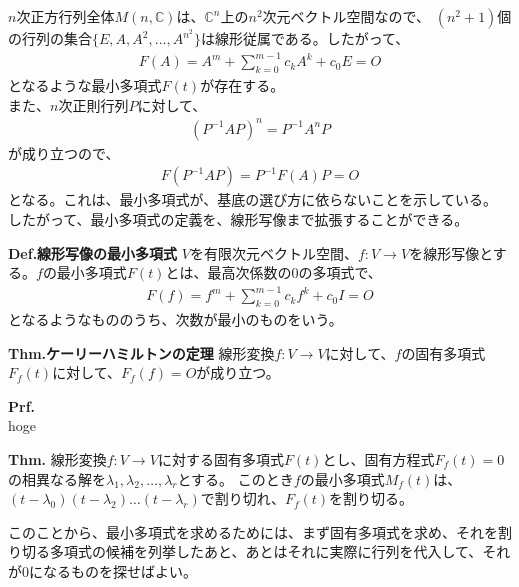 \documentclass[a4paper,11pt]{jsarticle}
\numberwithin{equation}{section}
\begin{document}
$n$次正方行列全体$M(n, \mathbb{C})$は、$\mathbb{C}^n$上の$n^2$次元ベクトル空間なので、
 $(n^2+1)$個の行列の集合$\{E, A, A^2, \dots, A^{n^2}\}$は線形従属である。したがって、
  \begin{align}
      F(A) = A^{m} + \sum_{k=0}^{m-1} c_kA^k + c_0E = O
  \end{align}
  となるような最小多項式$F(t)$が存在する。\\
  また、$n$次正則行列$P$に対して、
  \begin{align}
      (P^{-1}AP)^{n} = P^{-1}A^{n}P
  \end{align}
  が成り立つので、
  \begin{align}
      F(P^{-1}AP) = P^{-1}F(A)P = O
  \end{align}
  となる。これは、最小多項式が、基底の選び方に依らないことを示している。\\
  したがって、最小多項式の定義を、線形写像まで拡張することができる。

  \begin{itembox}[l]{\textbf{Def.線形写像の最小多項式}}
    $V$を有限次元ベクトル空間、$f: V \to V$を線形写像とする。$f$の最小多項式$F(t)$とは、最高次係数の0の多項式で、
    \begin{align}
        F(f) = f^{m} + \sum_{k=0}^{m-1} c_kf^{k} + c_0I = O
    \end{align}
    となるようなもののうち、次数が最小のものをいう。
\end{itembox}

\begin{itembox}[l]{\textbf{Thm.ケーリーハミルトンの定理}}
    線形変換$f: V \to V$に対して、$f$の固有多項式$F_f(t)$に対して、$F_f(f) = O$が成り立つ。
\end{itembox}
\textbf{Prf.}\\
hoge\hfill\qedsymbol\\

\begin{itembox}[l]{\textbf{Thm.}}
    線形変換$f: V \to V$に対する固有多項式$F(t)$とし、固有方程式$F_f(t) = 0$の相異なる解を$\lambda_1, \lambda_2, \dots, \lambda_r$とする。
    このとき$f$の最小多項式$M_f(t)$は、$(t-\lambda_0)(t-\lambda_2)\dots(t-\lambda_r)$で割り切れ、$F_f(t)$を割り切る。
\end{itembox}
このことから、最小多項式を求めるためには、まず固有多項式を求め、それを割り切る多項式の候補を列挙したあと、あとはそれに実際に行列を代入して、それが$0$になるものを探せばよい。\\
\end{document}
